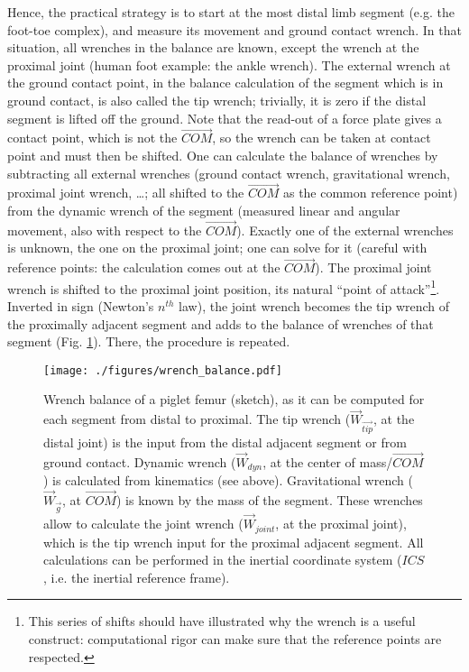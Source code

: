 Hence, the practical strategy \citep{Robertson2013,Lynch2017,Dumas2004} is to start at the most distal limb segment (e.g. the foot-toe complex), and measure its movement and ground contact wrench.
In that situation, all wrenches in the balance are known, except the wrench at the proximal joint (human foot example: the ankle wrench).
The external wrench at the ground contact point, in the balance calculation of the segment which is in ground contact, is also called the tip wrench; trivially, it is zero if the distal segment is lifted off the ground.
Note that the read-out of a force plate gives a contact point, which is not the \(\vec{COM}\), so the wrench can be taken at contact point and must then be shifted.
One can calculate the balance of wrenches by subtracting all external wrenches (ground contact wrench, gravitational wrench, proximal joint wrench, \ldots{}; all shifted to the \(\vec{COM}\) as the common reference point) from the dynamic wrench of the segment (measured linear and angular movement, also with respect to the \(\vec{COM}\)).
Exactly one of the external wrenches is unknown, the one on the proximal joint; one can solve for it (careful with reference points: the calculation comes out at the \(\vec{COM}\)).
The proximal joint wrench is shifted to the proximal joint position, its natural ``point of attack''\footnote{This series of shifts should have illustrated why the wrench is a useful construct: computational rigor can make sure that the reference points are respected.}.
Inverted in sign (Newton's \(n^{th}\) law), the joint wrench becomes the tip wrench of the proximally adjacent segment and adds to the balance of wrenches of that segment (Fig. \ref{fig:wrenchbalance}).
There, the procedure is repeated.

\begin{figure}[p]
\centering
\texttt{[image: ./figures/wrench\_balance.pdf]}
\caption{\label{fig:wrenchbalance}Wrench balance of a piglet femur (sketch), as it can be computed for each segment from distal to proximal. The tip wrench (\(\vec{W}_{\vec{tip}}\), at the distal joint) is the input from the distal adjacent segment or from ground contact. Dynamic wrench (\(\vec{W}_{dyn}\), at the center of mass/\(\vec{COM}\)) is calculated from kinematics (see above). Gravitational wrench (\(\vec{W}_{\vec{g}}\), at \(\vec{COM}\)) is known by the mass of the segment. These wrenches allow to calculate the joint wrench (\(\vec{W}_{joint}\), at the proximal joint), which is the tip wrench input for the proximal adjacent segment. All calculations can be performed in the inertial coordinate system (\(ICS\), i.e. the inertial reference frame).}
\end{figure}


